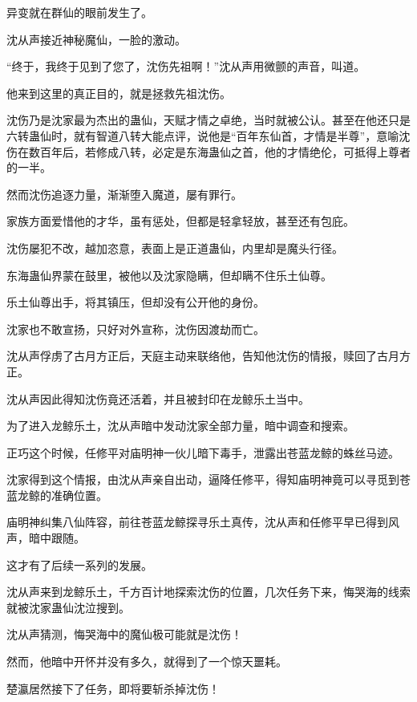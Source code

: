 
\begin{this_body}



异变就在群仙的眼前发生了。

沈从声接近神秘魔仙，一脸的激动。

“终于，我终于见到了您了，沈伤先祖啊！”沈从声用微颤的声音，叫道。

他来到这里的真正目的，就是拯救先祖沈伤。

沈伤乃是沈家最为杰出的蛊仙，天赋才情之卓绝，当时就被公认。甚至在他还只是六转蛊仙时，就有智道八转大能点评，说他是“百年东仙首，才情是半尊”，意喻沈伤在数百年后，若修成八转，必定是东海蛊仙之首，他的才情绝伦，可抵得上尊者的一半。

然而沈伤追逐力量，渐渐堕入魔道，屡有罪行。

家族方面爱惜他的才华，虽有惩处，但都是轻拿轻放，甚至还有包庇。

沈伤屡犯不改，越加恣意，表面上是正道蛊仙，内里却是魔头行径。

东海蛊仙界蒙在鼓里，被他以及沈家隐瞒，但却瞒不住乐土仙尊。

乐土仙尊出手，将其镇压，但却没有公开他的身份。

沈家也不敢宣扬，只好对外宣称，沈伤因渡劫而亡。

沈从声俘虏了古月方正后，天庭主动来联络他，告知他沈伤的情报，赎回了古月方正。

沈从声因此得知沈伤竟还活着，并且被封印在龙鲸乐土当中。

为了进入龙鲸乐土，沈从声暗中发动沈家全部力量，暗中调查和搜索。

正巧这个时候，任修平对庙明神一伙儿暗下毒手，泄露出苍蓝龙鲸的蛛丝马迹。

沈家得到这个情报，由沈从声亲自出动，逼降任修平，得知庙明神竟可以寻觅到苍蓝龙鲸的准确位置。

庙明神纠集八仙阵容，前往苍蓝龙鲸探寻乐土真传，沈从声和任修平早已得到风声，暗中跟随。

这才有了后续一系列的发展。

沈从声来到龙鲸乐土，千方百计地探索沈伤的位置，几次任务下来，悔哭海的线索就被沈家蛊仙沈泣搜到。

沈从声猜测，悔哭海中的魔仙极可能就是沈伤！

然而，他暗中开怀并没有多久，就得到了一个惊天噩耗。

楚瀛居然接下了任务，即将要斩杀掉沈伤！


\end{this_body}
